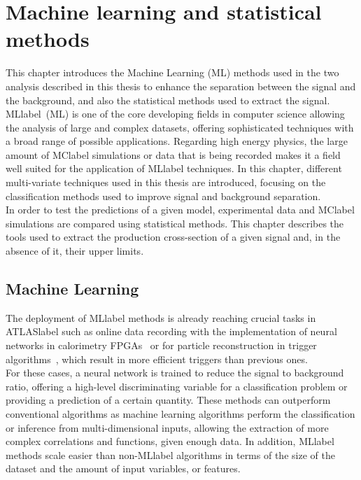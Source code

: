 \chapter{Machine learning and statistical methods}
\label{chapter:MLStat}

This chapter introduces the Machine Learning (ML) methods used in the two analysis described in this thesis to enhance the separation between the signal and the background, and also the statistical methods used to extract the signal.\\

\acrlong{MLlabel}~(ML) is one of the core developing fields in computer science allowing the analysis of large and complex datasets, offering sophisticated techniques with a broad range of possible applications. Regarding high energy physics, the large amount of \acrshort{MClabel} simulations or data that is being recorded makes it a field well suited for the application of \acrshort{MLlabel} techniques. In this chapter, different multi-variate techniques used in this thesis are introduced, focusing on the classification methods used to improve signal and background separation.\\

In order to test the predictions of a given model, experimental data and \acrshort{MClabel} simulations are compared using statistical methods. This chapter describes the tools used to extract the production cross-section of a given signal and, in the absence of it, their upper limits.

\section{Machine Learning}

The deployment of \acrshort{MLlabel} methods is already reaching crucial tasks in \acrshort{ATLASlabel} such as online data recording with the implementation of neural networks in calorimetry FPGAs~\cite{Laatu:2022fni} or for particle reconstruction in trigger algorithms~\cite{ATLAS:2019uhp}, which result in more efficient triggers than previous ones.\\

For these cases, a neural network is trained to reduce the signal to background ratio, offering a high-level discriminating variable for a classification problem or providing a prediction of a certain quantity. These methods can outperform conventional algorithms as machine learning algorithms perform the classification or inference from multi-dimensional inputs, allowing the extraction of more complex correlations and functions, given enough data. In addition, \acrshort{MLlabel} methods scale easier than non-\acrshort{MLlabel} algorithms in terms of the size of the dataset and the amount of input variables, or features.\\

